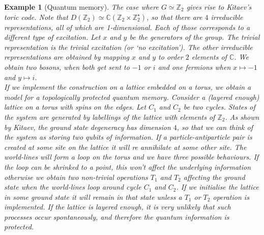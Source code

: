 \documentclass{article}
\newtheorem{example}{Example}
\begin{document}
\begin{example}[Quantum memory]
	The case where $G \simeq \mathbb{Z}_2$ gives rise to Kitaev's toric code. Note that $D(\mathbb{Z}_2) \simeq \mathbb{C}(\mathbb{Z}_2\times \mathbb{Z}_2^\star)$, so that there are $4$ irreducible representations, all of which are 1-dimensional. Each of those corresponds to a different type of excitation.  Let $x$ and $y$ be the generators of the group. The trivial representation is the trivial excitation (or `no excitation'). The other irreducible representations are obtained by mapping $x$ and $y$ to order $2$  elements of $\mathbb{C}$. We obtain two bosons, when both get sent to $-1$ or $i$ and one fermions when $x \mapsto -1$ and $y \mapsto i$.\\
	If we implement the construction on a lattice embedded on a torus, we obtain a model for a topologically protected quantum memory. Consider a (layered enough) lattice on a torus with spins on the edges. Let $C_1$ and $C_2$ be two cycles. States of the system are generated by labellings of the lattice with elements of $\mathbb{Z}_2$. As shown by Kitaev, the ground state degeneracy has dimension $4$, so that we can think of the system as storing two qubits of information. If a particle-antiparticle pair is created at some site on the lattice it will re annihilate at some other site. The world-lines will form a loop on the torus and we have three possible behaviours. If the loop can be shrinked to a point, this won't affect the underlying information otherwise we obtain two non-trivial operations $T_1$ and $T_2$ affecting the ground state when the world-lines loop around cycle $C_1$ and $C_2$. If we initialise the lattice in some ground state it will remain in that state unless a $T_1$ or $T_2$ operation is implemented. If the lattice is layered enough, it is very unlikely that such processes occur spontaneously, and therefore the quantum information is protected.
\end{example}
\end{document}
